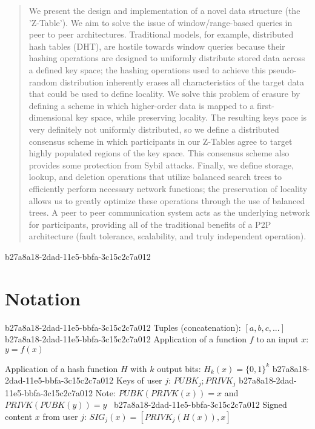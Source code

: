 \documentclass[12pt]{article}
\begin{document}
\maketitle

\begin{abstract}
We present the design and implementation of a novel data structure (the 'Z-Table'). We aim to solve the issue of window/range-based queries in peer to peer architectures. Traditional models, for example,  distributed hash tables (DHT), are hostile towards window queries because their hashing operations are designed to uniformly distribute stored data across a defined key space; the hashing operations used to achieve this pseudo-random distribution inherently erases all characteristics of the target data that could be used to define locality. We solve this problem of erasure by defining a scheme in which higher-order data is mapped to a first-dimensional key space, while preserving locality. The resulting keys pace is very definitely not uniformly distributed, so we define a distributed consensus scheme in which participants in our Z-Tables agree to target highly populated regions of the key space. This consensus scheme also provides some protection from Sybil attacks. Finally, we define storage, lookup, and deletion operations that utilize balanced search trees to efficiently perform necessary network functions; the preservation of locality allows us to greatly optimize these operations through the use of balanced trees. A peer to peer communication system acts as the underlying network for participants, providing all of the traditional benefits of a P2P architecture (fault tolerance, scalability, and truly independent operation).
\end{abstract}

b27a8a18-2dad-11e5-bbfa-3c15c2c7a012\section{Notation}
b27a8a18-2dad-11e5-bbfa-3c15c2c7a012
Tuples (concatenation): $[a,b,c,...]$
b27a8a18-2dad-11e5-bbfa-3c15c2c7a012
Application of a function $f$ to an input $x$: $y=f(x)$

Application of a hash function $H$ with $k$ output bits: $H_{k}(x) = \{0,1\}^k$
b27a8a18-2dad-11e5-bbfa-3c15c2c7a012
Keys of user $j$: $ PUBK_j; PRIVK_j $
b27a8a18-2dad-11e5-bbfa-3c15c2c7a012
Note: $PUBK(PRIVK(x)) = x$ and $PRIVK(PUBK(y)) = y$~
b27a8a18-2dad-11e5-bbfa-3c15c2c7a012
Signed content $x$ from user $j$: $SIG_j(x) = \left[ PRIVK_j( H(x) ), x \right]$
\end{document}
